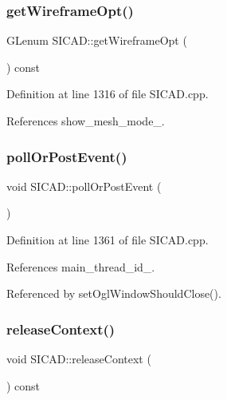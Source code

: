 \subsubsection{\texorpdfstring{get\+Wireframe\+Opt()}{getWireframeOpt()}}
{\footnotesize\ttfamily G\+Lenum S\+I\+C\+A\+D\+::get\+Wireframe\+Opt (\begin{DoxyParamCaption}{ }\end{DoxyParamCaption}) const}



Definition at line 1316 of file S\+I\+C\+A\+D.\+cpp.



References show\+\_\+mesh\+\_\+mode\+\_\+.

\mbox{\label{classSICAD_a8238a2b2c488c8b7ba85d5b2a0bf00ac}} 
\subsubsection{\texorpdfstring{poll\+Or\+Post\+Event()}{pollOrPostEvent()}}
{\footnotesize\ttfamily void S\+I\+C\+A\+D\+::poll\+Or\+Post\+Event (\begin{DoxyParamCaption}{ }\end{DoxyParamCaption})\hspace{0.3cm}{\ttfamily [private]}}



Definition at line 1361 of file S\+I\+C\+A\+D.\+cpp.



References main\+\_\+thread\+\_\+id\+\_\+.



Referenced by set\+Ogl\+Window\+Should\+Close().

\mbox{\label{classSICAD_ae626fa7f8fd4dc5fc4bdc4f5311beede}} 
\subsubsection{\texorpdfstring{release\+Context()}{releaseContext()}}
{\footnotesize\ttfamily void S\+I\+C\+A\+D\+::release\+Context (\begin{DoxyParamCaption}{ }\end{DoxyParamCaption}) const\hspace{0.3cm}{\ttfamily [virtual]}}



